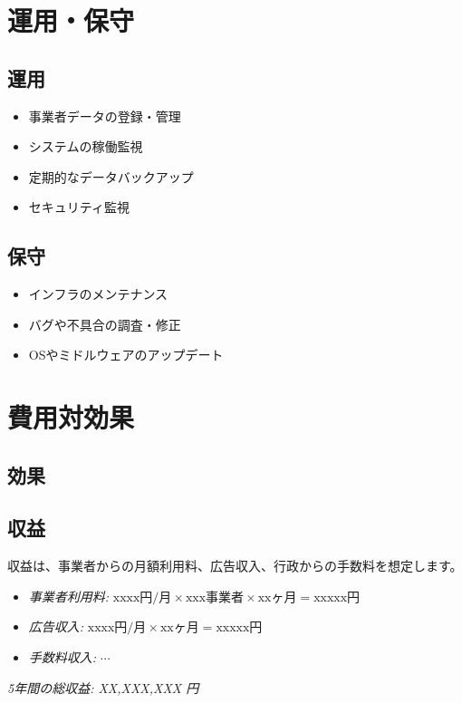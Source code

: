 \documentclass{docs}
\begin{document}
\section{運用・保守}
\subsection{運用}
\begin{itemize}
	\item 事業者データの登録・管理
	\item システムの稼働監視
	\item 定期的なデータバックアップ
	\item セキュリティ監視
\end{itemize}

\subsection{保守}
\begin{itemize}
	\item インフラのメンテナンス
	\item バグや不具合の調査・修正
	\item OSやミドルウェアのアップデート
\end{itemize}

\section{費用対効果}
\subsection{効果}


\subsection{収益}
収益は、事業者からの月額利用料、広告収入、行政からの手数料を想定します。
\begin{itemize}
	\item \emph{事業者利用料:} $\text{xxxx円/月}\times\text{xxx事業者}
	\times\text{xxヶ月}=\text{xxxxx円}$
	\item \emph{広告収入:} $\text{xxxx円/月}\times\text{xxヶ月}
	=\text{xxxxx円}$
	\item \emph{手数料収入:} $\cdots$
\end{itemize}
\emph{5年間の総収益: XX,XXX,XXX 円}
\end{document}
